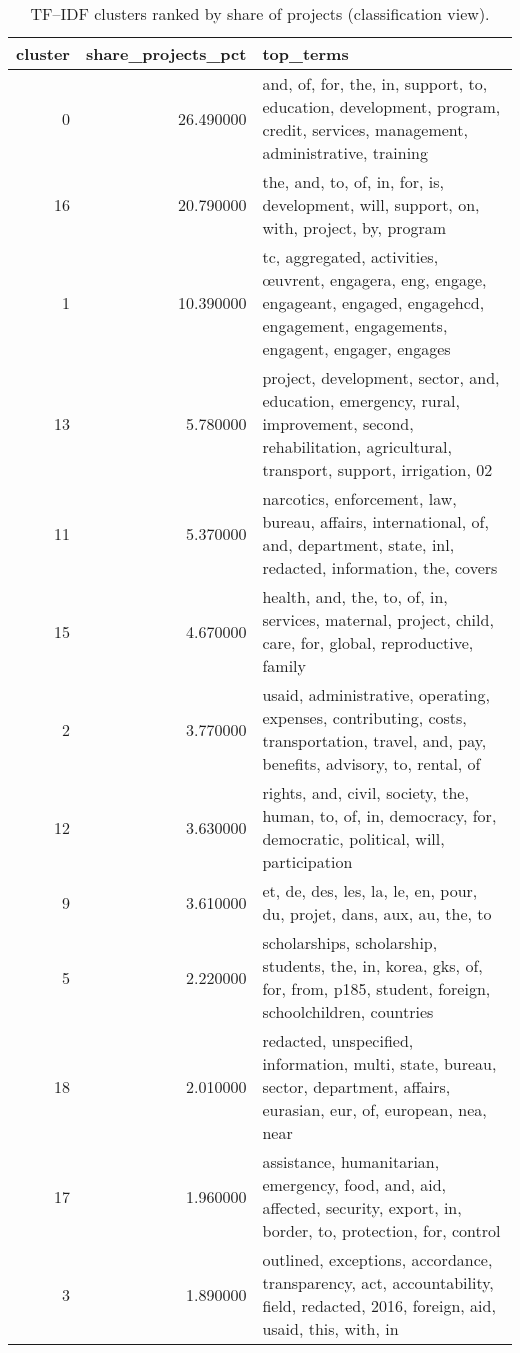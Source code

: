 \begin{table}
\caption{TF–IDF clusters ranked by share of projects (classification view).}
\label{tab:tfidf_classification_summary}
\begin{tabular}{rrl}
\toprule
cluster & share_projects_pct & top_terms \\
\midrule
0 & 26.490000 & and, of, for, the, in, support, to, education, development, program, credit, services, management, administrative, training \\
16 & 20.790000 & the, and, to, of, in, for, is, development, will, support, on, with, project, by, program \\
1 & 10.390000 & tc, aggregated, activities, œuvrent, engagera, eng, engage, engageant, engaged, engagehcd, engagement, engagements, engagent, engager, engages \\
13 & 5.780000 & project, development, sector, and, education, emergency, rural, improvement, second, rehabilitation, agricultural, transport, support, irrigation, 02 \\
11 & 5.370000 & narcotics, enforcement, law, bureau, affairs, international, of, and, department, state, inl, redacted, information, the, covers \\
15 & 4.670000 & health, and, the, to, of, in, services, maternal, project, child, care, for, global, reproductive, family \\
2 & 3.770000 & usaid, administrative, operating, expenses, contributing, costs, transportation, travel, and, pay, benefits, advisory, to, rental, of \\
12 & 3.630000 & rights, and, civil, society, the, human, to, of, in, democracy, for, democratic, political, will, participation \\
9 & 3.610000 & et, de, des, les, la, le, en, pour, du, projet, dans, aux, au, the, to \\
5 & 2.220000 & scholarships, scholarship, students, the, in, korea, gks, of, for, from, p185, student, foreign, schoolchildren, countries \\
18 & 2.010000 & redacted, unspecified, information, multi, state, bureau, sector, department, affairs, eurasian, eur, of, european, nea, near \\
17 & 1.960000 & assistance, humanitarian, emergency, food, and, aid, affected, security, export, in, border, to, protection, for, control \\
3 & 1.890000 & outlined, exceptions, accordance, transparency, act, accountability, field, redacted, 2016, foreign, aid, usaid, this, with, in \\

\end{tabular}
\end{table}
